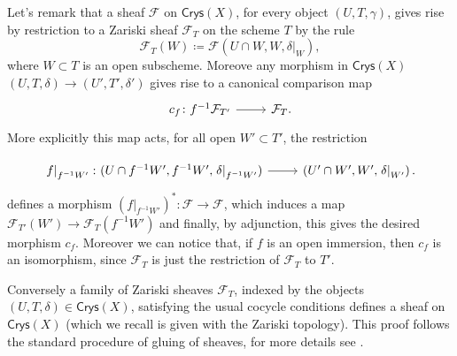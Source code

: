 \documentclass[../Main]{subfiles}
\begin{document}
\begin{rem}
	Let's remark that a sheaf $\mathcal{F}$ on $\mathsf{Crys}(X)$, for every
	object $\left(U, T, \gamma\right)$, gives rise by restriction
	to a Zariski sheaf $\mathcal{F}_T$ on the scheme $T$ by the rule
	\begin{equation*}
	\mathcal{F}_T(W) \coloneqq
	\mathcal{F}(U \cap W, W, \left.\delta\right|_{W})
	,\end{equation*}
	where $W \subset T$ is an open subscheme.
	Moreove any morphism in $\mathsf{Crys}(X)$
	$\left(U, T, \delta\right) \to \left(U', T', \delta'\right)$
	gives rise to a canonical comparison map
	\begin{equation*}
	\begin{tikzcd}[row sep = 0ex
		,/tikz/column 1/.append style={anchor=base east}
		,/tikz/column 2/.append style={anchor=base west}]
		c_f\colon f^{-1}\mathcal{F}_{T'} \arrow[r, "", rightarrow] &
		\mathcal{F}_T
	.\end{tikzcd}
	\end{equation*} 
	More explicitly this map acts, for all open $W' \subset T'$, the restriction

	\begin{equation*}
	\begin{tikzcd}[row sep = 0ex
		,/tikz/column 1/.append style={anchor=base east}
		,/tikz/column 2/.append style={anchor=base west}]
		\left.f\right|_{f^{-1}W'}\colon 
		(U \cap f^{-1}W', f^{-1}W', \left.\delta\right|_{f^{-1}W'} )
		\arrow[r, "", rightarrow] &
		\left(U' \cap W', W', \left.\delta\right|_{W'} \right)
	.\end{tikzcd}
	\end{equation*} 
	defines a morphism $(\left.f\right|_{f^{-1}W'})^*\colon \mathcal{F} \to \mathcal{F}$,
	which induces a map $\mathcal{F}_{T'}(W') \to \mathcal{F}_T(f^{-1}W')$
	and finally, by adjunction, this gives the desired morphism $c_f$.
	Moreover we can notice that, if $f$ is an open immersion, then
	$c_f$ is an isomorphism, since $\mathcal{F}_T$ is just the restriction
	of $\mathcal{F}_T$ to $T'$.

	Conversely a family of Zariski sheaves $\mathcal{F}_T$, indexed by 
	the objects $\left(U, T, \delta\right) \in \mathsf{Crys}(X)$, satisfying
	the usual cocycle conditions defines a sheaf on $\mathsf{Crys}(X)$ 
	(which we recall is given with the Zariski topology).
	This proof follows the standard procedure of gluing of sheaves,
	for more details see
	\cite[\href{https://stacks.math.columbia.edu/tag/07IN}{Section 07IN}]{SP}.
\end{rem}
\end{document}
